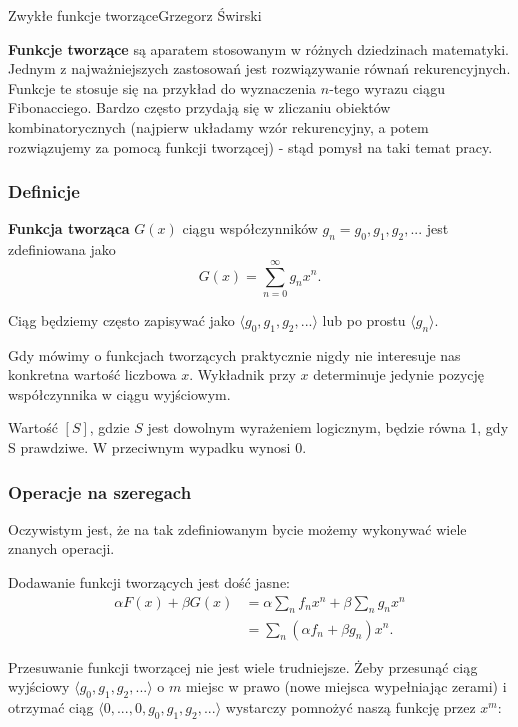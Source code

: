 \begin{referat}{Zwykłe funkcje tworzące}{Grzegorz Świrski}

\begin{teoria}

\textbf{Funkcje tworzące} są aparatem stosowanym w różnych
dziedzinach matematyki. Jednym z najważniejszych zastosowań
jest rozwiązywanie równań rekurencyjnych. Funkcje te stosuje się
na przykład do wyznaczenia $n$-tego wyrazu ciągu Fibonacciego.
Bardzo często przydają się w zliczaniu obiektów kombinatorycznych
(najpierw układamy wzór rekurencyjny, a potem rozwiązujemy za pomocą
funkcji tworzącej) - stąd pomysł na taki temat pracy.

\subsubsection{Definicje}

\textbf{Funkcja tworząca} $G(x)$ ciągu współczynników 
${g_n} = g_0, g_1, g_2,...$ jest zdefiniowana jako 
$$ G(x) = \sum^{\infty}_{n=0} g_n x^n.$$

Ciąg będziemy często zapisywać jako $\langle g_0, g_1, g_2, ... \rangle$
lub po prostu $\langle g_n \rangle$.

Gdy mówimy o funkcjach tworzących praktycznie nigdy nie interesuje
nas konkretna wartość liczbowa $x$. Wykładnik przy $x$ determinuje
jedynie pozycję współczynnika w ciągu wyjściowym.

Wartość $[S]$, gdzie $S$ jest dowolnym wyrażeniem logicznym, będzie równa
1, gdy S prawdziwe. W przeciwnym wypadku wynosi 0.

\subsubsection{Operacje na szeregach}

Oczywistym jest, że na tak zdefiniowanym bycie możemy wykonywać wiele
znanych operacji.

Dodawanie funkcji tworzących jest dość jasne:
\begin{align*} 
  \alpha F(x) + \beta G(x) &= \alpha \sum_n f_n x^n + \beta \sum_n g_n x^n \\
                           &= \sum_n (\alpha f_n + \beta g_n)x^n.
\end{align*}

Przesuwanie funkcji tworzącej nie jest wiele trudniejsze.
Żeby przesunąć ciąg wyjściowy $\langle g_0, g_1, g_2,... \rangle$
o $m$ miejsc w prawo (nowe miejsca wypełniając zerami) i otrzymać
ciąg $\langle 0,...,0,g_0,g_1,g_2,...\rangle$ wystarczy pomnożyć
naszą funkcję przez $x^m$:


\end{teoria}
\end{referat}
